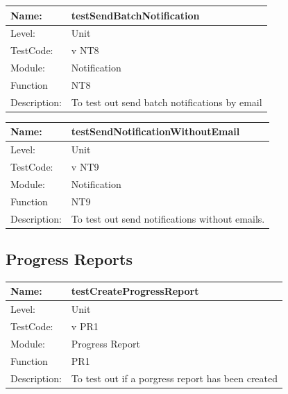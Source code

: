 \documentclass[12pt]{article}
\begin{document}
\begin{center}
\begin{tabular}{|l|p{12cm}|}
\hline

 Name: & testSendBatchNotification \\
\hline
Level: & Unit \\
\hline
TestCode: & v NT8 \\
\hline
Module:& Notification\\
\hline
Function & NT8 \\
\hline
Description: & To test out send batch notifications by email \\
\hline

\end{tabular}
\end{center}

\begin{center}
\begin{tabular}{|l|p{12cm}|}
\hline

 Name: & testSendNotificationWithoutEmail \\
\hline
Level: & Unit \\
\hline
TestCode: & v NT9 \\
\hline
Module:& Notification\\
\hline
Function & NT9 \\
\hline
Description: & To test out send notifications without emails. \\
\hline

\end{tabular}
\end{center}
\subsection{Progress Reports}
\begin{center}
\begin{tabular}{|l|p{12cm}|}
\hline

 Name: & testCreateProgressReport \\
\hline
Level: & Unit \\
\hline
TestCode: & v PR1 \\
\hline
Module:& Progress Report\\
\hline
Function & PR1 \\
\hline
Description: & To test out if a porgress report has been created \\
\hline

\end{tabular}
\end{center}
\end{document}
